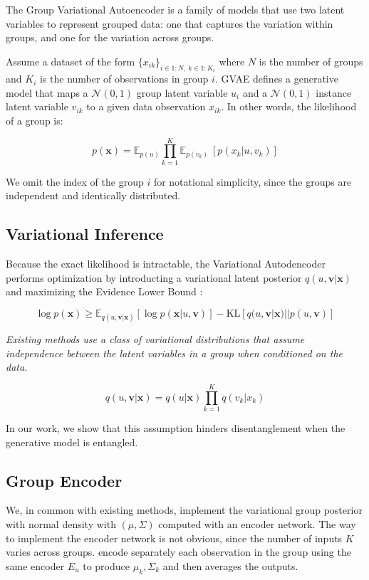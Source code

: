 \documentclass[nohyperref]{article}
\theoremstyle{plain}
\theoremstyle{definition}
\theoremstyle{remark}
\begin{document}
The Group Variational Autoencoder \citep{Bouchacourt2018MultiLevelVA,Hosoya2019GroupbasedLO} is a family of models that use two latent variables to represent grouped data: one that captures the variation within groups, and one for the variation across groups.

Assume a dataset of the form $\{x_{ik}\}_{i \in 1:N, ~k \in 1:K_i}$ where $N$ is the number of groups and $K_i$ is the number of observations in group $i$. GVAE defines a generative model that maps a $\mathcal{N} (0,1)$ group latent variable $u_i$ and a $\mathcal{N} (0,1)$ instance latent variable $v_{ik}$ to a given data observation $x_{ik}$. In other words, the likelihood of a group is:

$$p(\mathbf{x}) = \mathbb{E}_{p(u)}  \prod_{k=1}^{K} \mathbb{E}_{p(v_{k})} ~ [p(x_{k} | u, v_{k})]$$

We omit the index of the group $i$ for notational simplicity, since the groups are independent and identically distributed.

\subsection{Variational Inference}

Because the exact likelihood is intractable, the Variational Autodencoder \citep{Kingma2014AutoEncodingVB,JimenezRezende2014StochasticBA} performs optimization by introducting a variational latent posterior $q(u, \mathbf{v} | \mathbf{x})$ and maximizing the Evidence Lower Bound \citep{Jordan2004AnIT}:

$$\log p(\mathbf{x}) \geq \mathbb{E}_{q(u, \mathbf{v} | \mathbf{x})} [\log p(\mathbf{x} | u, \mathbf{v})] - \mathrm{KL} [q(u, \mathbf{v} | \mathbf{x}) || p(u, \mathbf{v})]$$

\textit{Existing methods use a class of variational distributions that assume independence between the latent variables in a group when conditioned on the data.}

$$q(u, \mathbf{v} | \mathbf{x}) = q(u | \mathbf{x}) \prod_{k=1}^K q(v_k | x_k)$$

In our work, we show that this assumption hinders disentanglement when the generative model is entangled.

\subsection{Group Encoder}

We, in common with existing methods, implement the variational group posterior with normal density with $(\mu, \Sigma)$ computed with an encoder network. The way to implement the encoder network is not obvious, since the number of inputs $K$ varies across groups. \citet{Hosoya2019GroupbasedLO} encode separately each observation in the group using the same encoder $E_u$ to produce $\mu_k, \Sigma_k$ and then averages the outputs.
\end{document}
